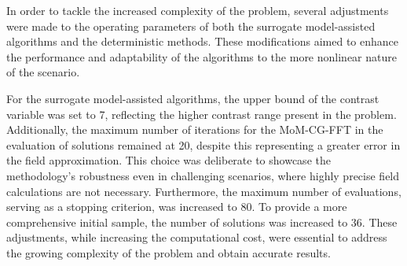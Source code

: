 			
			In order to tackle the increased complexity of the problem, several adjustments were made to the operating parameters of both the surrogate model-assisted algorithms and the deterministic methods. These modifications aimed to enhance the performance and adaptability of the algorithms to the more nonlinear nature of the scenario.
			
			For the surrogate model-assisted algorithms, the upper bound of the contrast variable was set to 7, reflecting the higher contrast range present in the problem. Additionally, the maximum number of iterations for the MoM-CG-FFT in the evaluation of solutions remained at 20, despite this representing a greater error in the field approximation. This choice was deliberate to showcase the methodology's robustness even in challenging scenarios, where highly precise field calculations are not necessary. Furthermore, the maximum number of evaluations, serving as a stopping criterion, was increased to 80. To provide a more comprehensive initial sample, the number of solutions was increased to 36. These adjustments, while increasing the computational cost, were essential to address the growing complexity of the problem and obtain accurate results.
			
